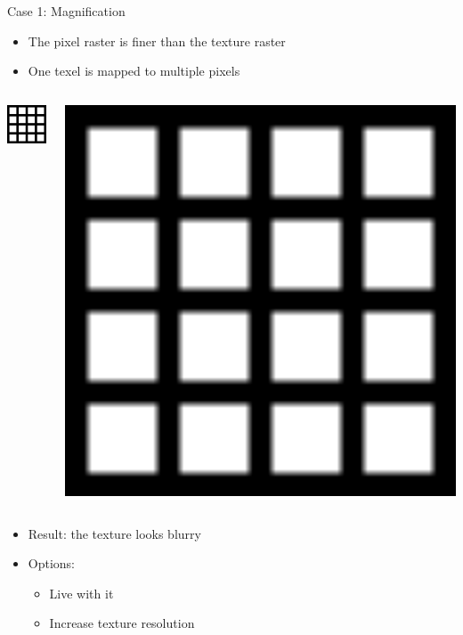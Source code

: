 \documentclass[utf8,stillsansserifmath,fleqn,t]{beamer}
\begin{document}
\begin{frame}
\frametitle{\insertsection}
Case 1: Magnification
\begin{itemize}
\item The pixel raster is finer than the texture raster
\item One texel is mapped to multiple pixels
\end{itemize}
\begin{columns}
\vspace*{-.3\textheight}
\centerline{\includegraphics[width=.2\textwidth]{./fig/texture-mag-2.png}}
\centerline{\includegraphics[width=.8\textwidth]{./fig/texture-mag-3.png}}
\end{columns}
\begin{itemize}
\item Result: the texture looks blurry
\item Options:
    \begin{itemize}
    \item Live with it
    \item Increase texture resolution
    \end{itemize}
\end{itemize}
\end{frame}
\end{document}
